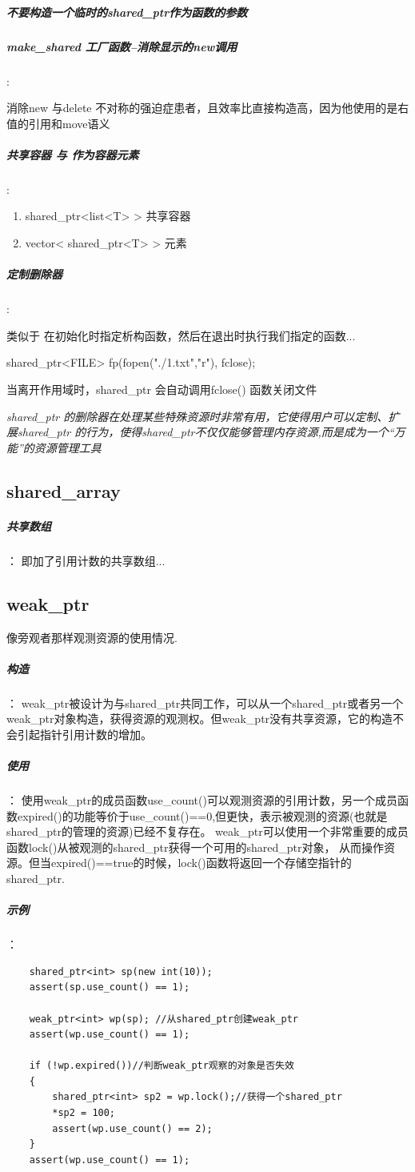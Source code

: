 \documentclass[UTF8,a4paper,12pt]{ctexbook}
\begin{document}
			\subparagraph{不要构造一个临时的shared\_ptr作为函数的参数}
			
			\subparagraph{make\_shared 工厂函数--消除显示的new调用}:
			
				消除new 与delete 不对称的强迫症患者，且效率比直接构造高，因为他使用的是右值的引用和move语义
				
			\subparagraph{共享容器 与 作为容器元素}:
				\begin{enumerate}[fullwidth,itemindent = 3em]
					\item shared\_ptr<list<T> > 共享容器 
					\item vector< shared\_ptr<T> >  元素 
				\end{enumerate}
				
			\subparagraph{定制删除器}:
			
				类似于 在初始化时指定析构函数，然后在退出时执行我们指定的函数...
				
				shared\_ptr<FILE> fp(fopen("./1.txt","r"), fclose);
				
				当离开作用域时，shared\_ptr 会自动调用fclose() 函数关闭文件
				
				\textit{shared\_ptr 的删除器在处理某些特殊资源时非常有用，它使得用户可以定制、扩展shared\_ptr 的行为，使得shared\_ptr不仅仅能够管理内存资源,而是成为一个“万能”的资源管理工具}
		\subsection{shared\_array}
			\subparagraph{共享数组}：
				即加了引用计数的共享数组...
		\subsection{weak\_ptr}
			像旁观者那样观测资源的使用情况.
			\subparagraph{构造}：
				weak\_ptr被设计为与shared\_ptr共同工作，可以从一个shared\_ptr或者另一个weak\_ptr对象构造，获得资源的观测权。但weak\_ptr没有共享资源，它的构造不会引起指针引用计数的增加。
			\subparagraph{使用}：
				使用weak\_ptr的成员函数use\_count()可以观测资源的引用计数，另一个成员函数expired()的功能等价于use\_count()==0,但更快，表示被观测的资源(也就是shared\_ptr的管理的资源)已经不复存在。
				weak\_ptr可以使用一个非常重要的成员函数lock()从被观测的shared\_ptr获得一个可用的shared\_ptr对象， 从而操作资源。但当expired()==true的时候，lock()函数将返回一个存储空指针的shared\_ptr.
			\subparagraph{示例}：
				\begin{lstlisting}
	shared_ptr<int> sp(new int(10));
	assert(sp.use_count() == 1);
	
	weak_ptr<int> wp(sp); //从shared_ptr创建weak_ptr
	assert(wp.use_count() == 1);
	
	if (!wp.expired())//判断weak_ptr观察的对象是否失效
	{
		shared_ptr<int> sp2 = wp.lock();//获得一个shared_ptr
		*sp2 = 100;
		assert(wp.use_count() == 2);
	}
	assert(wp.use_count() == 1);			
				\end{lstlisting}
\end{document}
